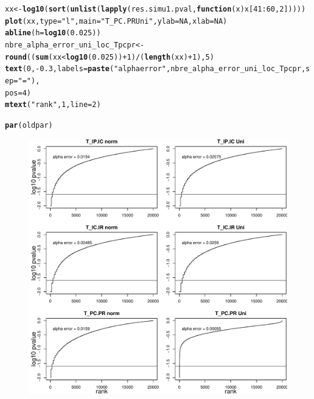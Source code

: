 \documentclass[12pt]{article}\usepackage[]{graphicx}\usepackage[]{color}
\makeatletter
\def\maxwidth{ %
  \ifdim\Gin@nat@width>\linewidth
    \linewidth
  \else
    \Gin@nat@width
  \fi
}
\newcommand{\hlnum}[1]{\textcolor[rgb]{0.686,0.059,0.569}{#1}}%
\newcommand{\hlstr}[1]{\textcolor[rgb]{0.192,0.494,0.8}{#1}}%
\newcommand{\hlopt}[1]{\textcolor[rgb]{0,0,0}{#1}}%
\newcommand{\hlstd}[1]{\textcolor[rgb]{0.345,0.345,0.345}{#1}}%
\newcommand{\hlkwa}[1]{\textcolor[rgb]{0.161,0.373,0.58}{\textbf{#1}}}%
\newcommand{\hlkwb}[1]{\textcolor[rgb]{0.69,0.353,0.396}{#1}}%
\newcommand{\hlkwc}[1]{\textcolor[rgb]{0.333,0.667,0.333}{#1}}%
\newcommand{\hlkwd}[1]{\textcolor[rgb]{0.737,0.353,0.396}{\textbf{#1}}}%
\newenvironment{kframe}{%
 \def\at@end@of@kframe{}%
 \ifinner\ifhmode%
  \def\at@end@of@kframe{\end{minipage}}%
  \begin{minipage}{\columnwidth}%
 \fi\fi%
 \def\FrameCommand##1{\hskip\@totalleftmargin \hskip-\fboxsep
 \colorbox{shadecolor}{##1}\hskip-\fboxsep
     \hskip-\linewidth \hskip-\@totalleftmargin \hskip\columnwidth}%
 \MakeFramed {\advance\hsize-\width
   \@totalleftmargin\z@ \linewidth\hsize
   \@setminipage}}%
 {\par\unskip\endMakeFramed%
 \at@end@of@kframe}
\newenvironment{knitrout}{}{} %
\makeatother
\begin{document}
\begin{knitrout}
\begin{kframe}
\begin{alltt}
\hlstd{xx} \hlkwb{<-} \hlkwd{log10}\hlstd{(}\hlkwd{sort}\hlstd{(}\hlkwd{unlist}\hlstd{(}\hlkwd{lapply}\hlstd{(res.simu1.pval,} \hlkwa{function}\hlstd{(}\hlkwc{x}\hlstd{) x[}\hlnum{41}\hlopt{:}\hlnum{60}\hlstd{,} \hlnum{2}\hlstd{]))))}
\hlkwd{plot}\hlstd{(xx,} \hlkwc{type} \hlstd{=} \hlstr{"l"}\hlstd{,} \hlkwc{main} \hlstd{=} \hlstr{"T_PC.PR Uni"}\hlstd{,} \hlkwc{ylab} \hlstd{=} \hlnum{NA}\hlstd{,} \hlkwc{xlab} \hlstd{=} \hlnum{NA}\hlstd{)}
\hlkwd{abline}\hlstd{(}\hlkwc{h} \hlstd{=} \hlkwd{log10}\hlstd{(}\hlnum{0.025}\hlstd{))}
\hlstd{nbre_alpha_error_uni_loc_Tpcpr} \hlkwb{<-} \hlkwd{round}\hlstd{((}\hlkwd{sum}\hlstd{(xx} \hlopt{<} \hlkwd{log10}\hlstd{(}\hlnum{0.025}\hlstd{))} \hlopt{+}\hlnum{1} \hlstd{)} \hlopt{/} \hlstd{(}\hlkwd{length}\hlstd{(xx)}\hlopt{+}\hlnum{1}\hlstd{),} \hlnum{5}\hlstd{)}
\hlkwd{text}\hlstd{(}\hlnum{0}\hlstd{,} \hlopt{-}\hlnum{0.3}\hlstd{,} \hlkwc{labels} \hlstd{=} \hlkwd{paste}\hlstd{(}\hlstr{"alpha error"}\hlstd{, nbre_alpha_error_uni_loc_Tpcpr,} \hlkwc{sep} \hlstd{=} \hlstr{" = "}\hlstd{),}
     \hlkwc{pos} \hlstd{=} \hlnum{4}\hlstd{)}
\hlkwd{mtext}\hlstd{(}\hlstr{"rank"}\hlstd{,} \hlnum{1}\hlstd{,} \hlkwc{line} \hlstd{=} \hlnum{2}\hlstd{)}

\hlkwd{par}\hlstd{(oldpar)}
\end{alltt}
\end{kframe}\begin{figure}

{\centering \includegraphics[width=\maxwidth]{figure/No_Filter_results-1} 

}
\end{figure}
\end{knitrout}
\end{document}
